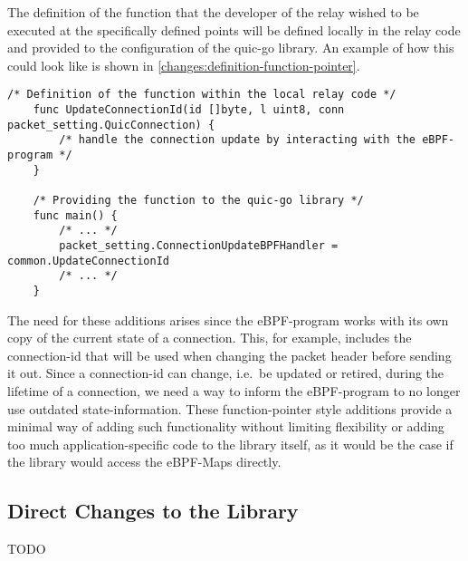The definition of the function that the developer of the relay wished to be executed at the specifically
defined points will be defined locally in the relay code and provided to the configuration of the quic-go library.
An example of how this could look like is shown in \autoref{changes:definition-function-pointer}.
\vspace{0.2cm}
\begin{lstlisting}[style=GoStyle, label=changes:definition-function-pointer, caption=An example of how the addition looks on the relay side.]
    /* Definition of the function within the local relay code */
    func UpdateConnectionId(id []byte, l uint8, conn packet_setting.QuicConnection) {
        /* handle the connection update by interacting with the eBPF-program */
    }   

    /* Providing the function to the quic-go library */
    func main() {
        /* ... */
        packet_setting.ConnectionUpdateBPFHandler = common.UpdateConnectionId
        /* ... */
    }
\end{lstlisting}

The need for these additions arises since the eBPF-program works with its own copy of the current state of a connection.
This, for example, includes the connection-id that will be used when changing the packet header before sending it out.
Since a connection-id can change, i.e.~be updated or retired, during the lifetime of a connection, we need a way to inform 
the eBPF-program to no longer use outdated state-information.
These function-pointer style additions provide a minimal way of adding such functionality without limiting flexibility 
or adding too much application-specific code to the library itself, as it would be the case if the library would access 
the eBPF-Maps directly.

\subsection{Direct Changes to the Library}
TODO
